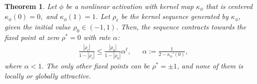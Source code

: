 \documentclass[twoside]{article}
\newcommand{\km}{\kappa_\phi}
\newtheorem{theorem}{Theorem}
\theoremstyle{definition}
\newcommand{\thomas}[1]{{\color{blue}\textit{#1}}}
\begin{document}
\begin{theorem}\label{thm:global_attract_centered}
Let $\phi$ be a nonlinear activation with kernel map $\km$ that is centered $\km(0)=0,$ and $\km(1)=1$. 
Let $\rho_\ell$ be the kernel sequence generated by $\km$, given the initial value $\rho_0 \in(-1 , 1)$.
Then, the sequence contracts towards the fixed point at zero $\rho^*=0$ with rate $\alpha$:
    \begin{align}
        &\frac{|\rho_\ell|}{1-|\rho_\ell|} \le \frac{|\rho_0|}{1-|\rho_0|}\alpha^{\ell}, && \alpha := \frac{1}{2-\km'(0)},
    \end{align}
 where $\alpha<1.$ The only other fixed points can be $\rho^*=\pm 1$, and none of them is locally or globally attractive.
\end{theorem}
\end{document}
